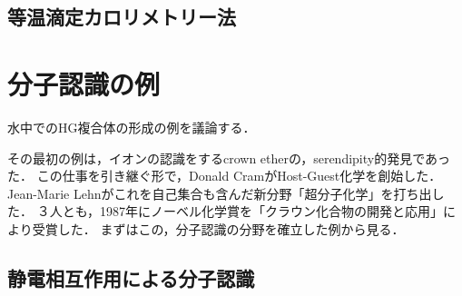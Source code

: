 \documentclass[uplatex, dvipdfmx]{jsreport}
\begin{document}
\subsection{等温滴定カロリメトリー法}

\section{分子認識の例}
水中でのHG複合体の形成の例を議論する．

その最初の例は，イオンの認識をするcrown etherの，serendipity的発見であった．
この仕事を引き継ぐ形で，Donald CramがHost-Guest化学を創始した．
Jean-Marie Lehnがこれを自己集合も含んだ新分野「超分子化学」を打ち出した．
３人とも，1987年にノーベル化学賞を「クラウン化合物の開発と応用」により受賞した．
まずはこの，分子認識の分野を確立した例から見る．

\subsection{静電相互作用による分子認識}
\end{document}
